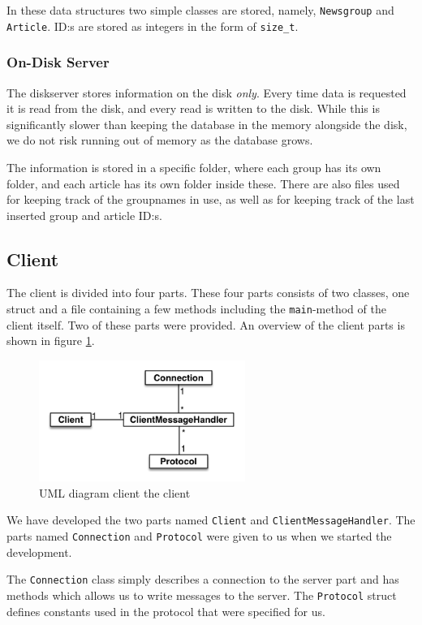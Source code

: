 \documentclass[a4paper]{article}
\begin{document}
In these data structures two simple classes are stored, namely, \texttt{Newsgroup} and \texttt{Article}. ID:s are stored as integers in the form of \texttt{size\_t}.


\subsubsection{On-Disk Server}
The diskserver stores information on the disk \emph{only}. Every time data is requested it is read from the disk, and every read is written to the disk. While this is significantly slower than keeping the database in the memory alongside the disk, we do not risk running out of memory as the database grows.

The information is stored in a specific folder, where each group has its own folder, and each article has its own folder inside these. There are also files used for keeping track of the groupnames in use, as well as for keeping track of the last inserted group and article ID:s.

\subsection{Client}
The client is divided into four parts. These four parts consists of two classes, one struct and a file containing a few methods including the \texttt{main}-method of the client itself. Two of these parts were provided. An overview of the client parts is shown in figure \ref{clientUML}.

\begin{figure}
    \centering
    \includegraphics[width=0.6\textwidth]{projectUML-client.png}
    \caption{UML diagram client the client}
    \label{clientUML}
\end{figure}

We have developed the two parts named \texttt{Client} and \texttt{ClientMessageHandler}. The parts named \texttt{Connection} and \texttt{Protocol} were given to us when we started the development.

The \texttt{Connection} class simply describes a connection to the server part and has methods which allows us to write messages to the server. The \texttt{Protocol} struct defines constants used in the protocol that were specified for us.
\end{document}

